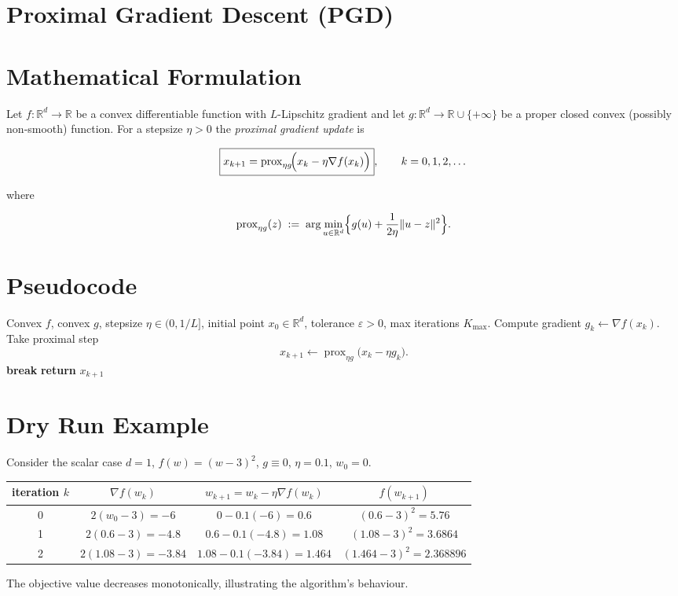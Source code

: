 \documentclass{article}
\newcommand{\prox}{\operatorname{prox}}
\newcommand{\R}{\mathbb{R}}
\begin{document}
\section*{Proximal Gradient Descent (PGD)}

\section*{Mathematical Formulation}
Let $f:\R^{d}\rightarrow\R$ be a convex differentiable function with $L$-Lipschitz gradient and let $g:\R^{d}\rightarrow\R\cup\{+\infty\}$ be a proper closed convex (possibly non‑smooth) function.  
For a stepsize $\eta>0$ the \emph{proximal gradient update} is  

\[
\boxed{%
x_{k+1}= \prox_{\eta g}\!\Bigl(x_{k}-\eta \nabla f(x_{k})\Bigr)},
\qquad k=0,1,2,\dots
\]

where  

\[
\prox_{\eta g}(z)\;:=\;\arg\min_{u\in\R^{d}}\Bigl\{ g(u)+\frac{1}{2\eta}\|u-z\|^{2}\Bigr\}.
\]

\section*{Pseudocode}
\begin{algorithm}[H]
\caption{Proximal Gradient Descent}
\begin{algorithmic}[1]
\Require Convex $f$, convex $g$, stepsize $\eta\in(0,1/L]$, initial point $x_{0}\in\R^{d}$, tolerance $\varepsilon>0$, max iterations $K_{\max}$.
    \State Compute gradient $g_{k}\gets\nabla f(x_{k})$.
    \State Take proximal step 
    \[
    x_{k+1}\gets \prox_{\eta g}\bigl(x_{k}-\eta g_{k}\bigr).
    \]
        \State \textbf{break}
    \EndIf
\EndFor
\State \textbf{return} $x_{k+1}$
\end{algorithmic}
\end{algorithm}

\section*{Dry Run Example}
Consider the scalar case $d=1$, $f(w)=(w-3)^{2}$, $g\equiv0$, $\eta=0.1$, $w_{0}=0$.

\begin{center}
\begin{tabular}{c|c|c|c}
iteration $k$ & $\nabla f(w_{k})$ & $w_{k+1}=w_{k}-\eta\nabla f(w_{k})$ & $f(w_{k+1})$\\\hline
0 & $2(w_{0}-3)=-6$ & $0-0.1(-6)=0.6$ & $(0.6-3)^{2}=5.76$\\
1 & $2(0.6-3)=-4.8$ & $0.6-0.1(-4.8)=1.08$ & $(1.08-3)^{2}=3.6864$\\
2 & $2(1.08-3)=-3.84$ & $1.08-0.1(-3.84)=1.464$ & $(1.464-3)^{2}=2.368896$\\
\end{tabular}
\end{center}
The objective value decreases monotonically, illustrating the algorithm’s behaviour.
\end{document}
